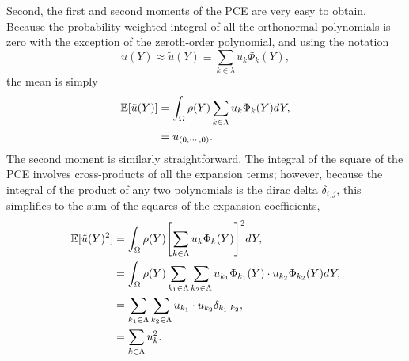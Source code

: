 Second, the first and second moments of the PCE are very easy to obtain.  Because the probability-weighted 
integral of all the orthonormal polynomials is zero with the exception of the zeroth-order polynomial, and
using the notation 
\begin{equation}
  u(Y) \approx \tilde u(Y) \equiv \sum_{k\in\lambda} u_k\Phi_k(Y),
\end{equation}
the mean is simply
\begin{align}
  \mathbb{E}[ \tilde u(Y)]  &= \int_\Omega \rho(Y) \sum_{k\in\Lambda} u_k\Phi_k(Y) dY, \nonumber\\
                      &= u_{(0,\cdots,0)}.
\end{align}
The second moment is similarly straightforward.  The integral of the square of the PCE involves cross-products of
all the expansion terms; however, because the integral of the product of any two polynomials is the dirac
delta $\delta_{i,j}$, this simplifies to the sum of the squares of the expansion coefficients,
\begin{align}
  \expv{\tilde u(Y)^2} &=\int_\Omega \rho(Y) \qty[\sum_{k\in\Lambda} u_k\Phi_k(Y)]^2 dY,
                 \nonumber\\ \vspace{5pt}
  &= \int_\Omega \rho(Y) \sum_{k_1\in\Lambda} \sum_{k_2\in\Lambda} u_{k_1}\Phi_{k_1}(Y) \cdot 
                           u_{k_2}\Phi_{k_2}(Y) dY, \nonumber \\ \vspace{5pt}
  &= \sum_{k_1\in\Lambda} \sum_{k_2\in\Lambda} u_{k_1} \cdot u_{k_2}\delta_{k_1,k_2},\nonumber \\ \vspace{5pt}
  &= \sum_{k\in\Lambda} u_k^2.
\end{align}

